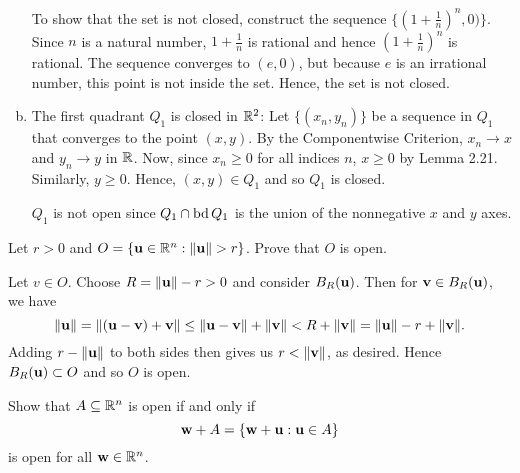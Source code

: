 \documentclass[letterpaper, twoside, 12pt]{book}
\begin{document}
\begin{solution}
\begin{enumerate}[(a)]
          To show that the set is not closed, construct the
          sequence \( \{ (1 + \frac{1}{n})^n, 0) \}\). Since \(n\)
          is a natural number, \(1 + \frac{1}{n}\) is rational 
          and hence \((1 + \frac{1}{n})^n\) is rational. The
          sequence converges to \((e, 0)\), but because \(e\)
          is an irrational number, this point is not inside
          the set. Hence, the set is not closed.

    \item The first quadrant \(Q_1\) is closed in \(\mathbb R^2\): Let 
          \(\{(x_n, y_n)\}\) be a sequence in \(Q_1\) that converges to
          the point \((x, y)\). By the Componentwise Criterion,
          \(x_n \to x\) and \(y_n \to y\) in \(\mathbb R\). Now, since
          \(x_n \geq 0\) for all indices \(n\), \(x \geq 0\) by Lemma
          2.21. Similarly, \(y \geq 0\). Hence, \((x, y) \in Q_1\)
          and so \(Q_1\) is closed.
        
          \(Q_1\) is not open since \( Q_1 \cap \operatorname{bd} Q_1 \)
          is the union of the nonnegative \(x\) and \(y\) axes.
        
  \end{enumerate}
\end{solution}

\begin{exercise}[3]
  Let \(r>0\) and \(O=\{\vect u\in\mb R^n:\|\vect u\|>r\}\). Prove that \(O\)
  is open.
\end{exercise}

\begin{solution}
    Let \(v \in O\). Choose \(R = \|\mathbf u\| - r > 0\) and consider
    \(B_R(\mathbf u)\). Then for \(\mathbf v \in B_R(\mathbf u)\), we have
    \[ \|\mathbf u\| = \|(\mathbf u - \mathbf v) + \mathbf v\| 
                  \leq \|\mathbf u - \mathbf v\| + \|\mathbf v\|
              < R + \|\mathbf v\| = \|\mathbf u\| - r + \|\mathbf v\| .\]
    Adding \(r - \|\mathbf u\|\) to both sides then gives us
    \(r < \|\mathbf v\|\), as desired. Hence \(B_R(\mathbf u) \subset O\)
    and so \(O\) is open.
\end{solution}

\begin{exercise}[7a]
  Show that \(A\subseteq\mathbb R^n\) is open if and only if
  \[
    \mathbf w + A = \{\mathbf w+\mathbf u:\mathbf u\in A\}
  \]
  is open for all \(\mathbf w\in\mathbb R^n\).
\end{exercise}
\end{document}
